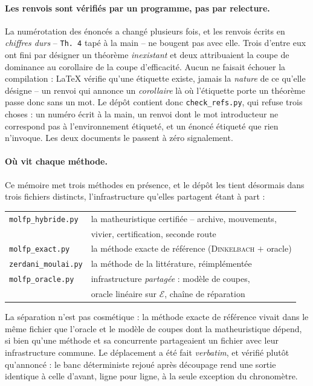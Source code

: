 \documentclass[11pt,a4paper]{article}
\theoremstyle{plain}
\theoremstyle{remark}
\newcommand{\Ecal}{\mathcal{E}}
\begin{document}
\paragraph{Les renvois sont vérifiés par un programme, pas par relecture.}
La numérotation des énoncés a changé plusieurs fois, et les renvois écrits
en \emph{chiffres durs} -- \texttt{Th.\ 4} tapé à la main -- ne bougent pas
avec elle. Trois
d'entre eux ont fini par désigner un théorème \emph{inexistant} et deux
attribuaient la coupe de dominance au corollaire de la coupe d'efficacité.
Aucun ne faisait échouer la compilation : \LaTeX{} vérifie qu'une étiquette
existe, jamais la \emph{nature} de ce qu'elle désigne -- un renvoi qui
annonce un \emph{corollaire} là où l'étiquette porte un théorème passe donc
sans un mot. Le dépôt contient
donc \texttt{check\_refs.py}, qui refuse trois choses : un numéro écrit à la
main, un renvoi dont le mot introducteur ne correspond pas à
l'environnement étiqueté, et un énoncé étiqueté que rien n'invoque. Les deux
documents le passent à zéro signalement.

\paragraph{Où vit chaque méthode.} Ce mémoire met trois méthodes en
présence, et le dépôt les tient désormais dans trois fichiers distincts,
l'infrastructure qu'elles partagent étant à part :
%
\begin{center}
\setlength{\tabcolsep}{5pt}\small
\begin{tabular}{ll}
\toprule
\texttt{molfp\_hybride.py} & la matheuristique certifiée -- archive,
  mouvements,\\
 & vivier, certification, seconde route\\
\texttt{molfp\_exact.py} & la méthode exacte de référence
  (\textsc{Dinkelbach} $+$ oracle)\\
\texttt{zerdani\_moulai.py} & la méthode de la littérature, réimplémentée\\
\midrule
\texttt{molfp\_oracle.py} & infrastructure \emph{partagée} : modèle de
  coupes,\\
 & oracle linéaire sur $\Ecal$, chaîne de réparation\\
\bottomrule
\end{tabular}
\end{center}
%
\noindent
La séparation n'est pas cosmétique : la méthode exacte de référence vivait
dans le même fichier que l'oracle et le modèle de coupes dont la
matheuristique dépend, si bien qu'une méthode et sa concurrente partageaient
un fichier avec leur infrastructure commune. Le déplacement a été fait
\emph{verbatim}, et vérifié plutôt qu'annoncé : le banc déterministe rejoué
après découpage rend une sortie identique à celle d'avant, ligne pour ligne,
à la seule exception du chronomètre.
\end{document}
